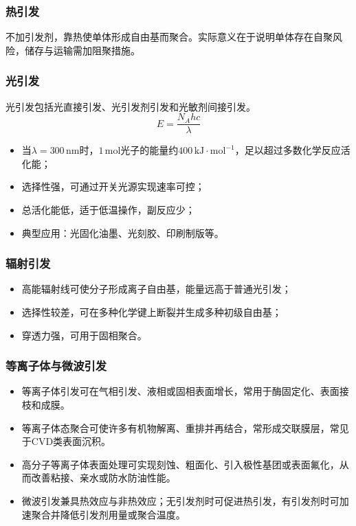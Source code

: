 ﻿\documentclass[12pt,a4paper]{article}
\begin{document}
\subsubsection{热引发}
不加引发剂，靠热使单体形成自由基而聚合。实际意义在于说明单体存在自聚风险，储存与运输需加阻聚措施。

\subsubsection{光引发}
光引发包括光直接引发、光引发剂引发和光敏剂间接引发。
\[
E=\frac{N_Ahc}{\lambda}
\]
\begin{itemize}
  \item 当$\lambda=300\,\mathrm{nm}$时，$1\,\mathrm{mol}$光子的能量约$400\,\mathrm{kJ\cdot mol^{-1}}$，足以超过多数化学反应活化能；
  \item 选择性强，可通过开关光源实现速率可控；
  \item 总活化能低，适于低温操作，副反应少；
  \item 典型应用：光固化油墨、光刻胶、印刷制版等。
\end{itemize}

\subsubsection{辐射引发}
\begin{itemize}
  \item 高能辐射线可使分子形成离子自由基，能量远高于普通光引发；
  \item 选择性较差，可在多种化学键上断裂并生成多种初级自由基；
  \item 穿透力强，可用于固相聚合。
\end{itemize}

\subsubsection{等离子体与微波引发}
\begin{itemize}
  \item 等离子体引发可在气相引发、液相或固相表面增长，常用于酶固定化、表面接枝和成膜。
  \item 等离子体态聚合可使许多有机物解离、重排并再结合，常形成交联膜层，常见于CVD类表面沉积。
  \item 高分子等离子体表面处理可实现刻蚀、粗面化、引入极性基团或表面氟化，从而改善粘接、亲水或防水防油性能。
  \item 微波引发兼具热效应与非热效应；无引发剂时可促进热引发，有引发剂时可加速聚合并降低引发剂用量或聚合温度。
\end{itemize}
\end{document}
